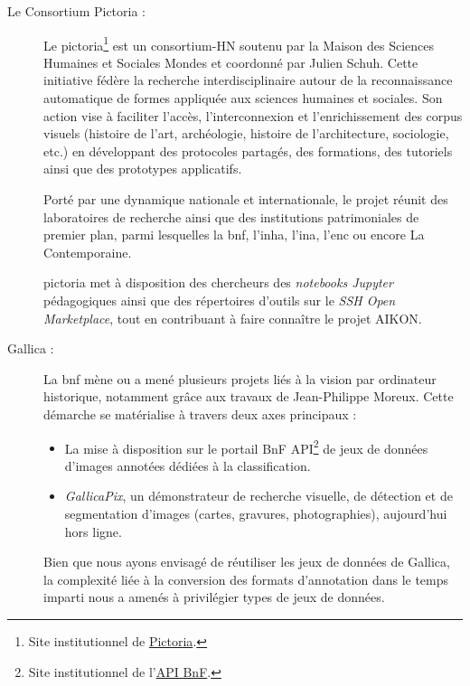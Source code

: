 \begin{description}
    
        \item[Le Consortium Pictoria :] Le \gls{pictoria}\footnote{Site institutionnel de \href{https://pictoria.hypotheses.org/}{Pictoria}.} est un consortium-HN soutenu par la Maison des Sciences Humaines et Sociales Mondes et coordonné par Julien Schuh. Cette initiative fédère la recherche interdisciplinaire autour de la reconnaissance automatique de formes appliquée aux sciences humaines et sociales. Son action vise à faciliter l'accès, l'interconnexion et l'enrichissement des corpus visuels (histoire de l'art, archéologie, histoire de l'architecture, sociologie, etc.) en développant des protocoles partagés, des formations, des tutoriels ainsi que des prototypes applicatifs.
        
        Porté par une dynamique nationale et internationale, le projet réunit des laboratoires de recherche ainsi que des institutions patrimoniales de premier plan, parmi lesquelles la \gls{bnf}, l'\gls{inha}, l'\gls{ina}, l'\gls{enc} ou encore La Contemporaine.
        
        \gls{pictoria} met à disposition des chercheurs des \textit{notebooks Jupyter} pédagogiques ainsi que des répertoires d'outils sur le \textit{SSH Open Marketplace}, tout en contribuant à faire connaître le projet AIKON.
        
        \item[Gallica :] La \gls{bnf} mène ou a mené plusieurs projets liés à la vision par ordinateur historique, notamment grâce aux travaux de Jean-Philippe Moreux. Cette démarche se matérialise à travers deux axes principaux :
        \begin{itemize}
        	\item La mise à disposition sur le portail BnF API\footnote{Site institutionnel de l'\href{https://api.bnf.fr/fr/node/181\#scroll-nav__1}{API BnF}.} de jeux de données d'images annotées dédiées à la classification.
        	\item \textit{GallicaPix}, un démonstrateur de recherche visuelle, de détection et de segmentation d'images (cartes, gravures, photographies), aujourd'hui hors ligne.
        \end{itemize}
        Bien que nous ayons envisagé de réutiliser les jeux de données de Gallica, la complexité liée à la conversion des formats d'annotation dans le temps imparti nous a amenés à privilégier types de jeux de données.
        

\end{description}
